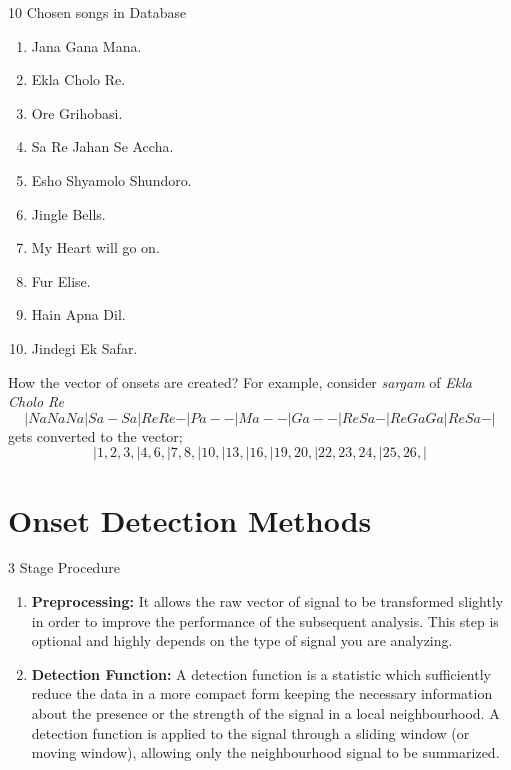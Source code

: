 \documentclass[10pt]{beamer}
\begin{document}
\begin{frame}{10 Chosen songs in Database}
    \begin{multicols}{2}
    \begin{enumerate}
        \item Jana Gana Mana.
        \item Ekla Cholo Re.
        \item Ore Grihobasi.
        \item Sa Re Jahan Se Accha.
        \item Esho Shyamolo Shundoro.
        \item Jingle Bells.
        \item My Heart will go on.
        \item Fur Elise.
        \item Hain Apna Dil.
        \item Jindegi Ek Safar.
    \end{enumerate}
    \end{multicols}
\end{frame}

\begin{frame}{How the vector of onsets are created?}
    For example, consider \textit{sargam} of \textit{Ekla Cholo Re}
    $$\vert Na Na Na \vert Sa - Sa \vert Re Re - \vert Pa - - \vert Ma - - \vert Ga - - \vert Re Sa - \vert Re Ga Ga \vert Re Sa - \vert$$
    gets converted to the vector;
    $$\vert 1, 2, 3, \vert 4, 6, \vert 7, 8, \vert 10,\vert 13, \vert 16,\vert 19, 20, \vert 22, 23, 24, \vert 25, 26,\vert$$
\end{frame}


\section{Onset Detection Methods}

\begin{frame}{3 Stage Procedure}
    \begin{enumerate}
    \item \textbf{Preprocessing:} It allows the raw vector of signal to be transformed slightly in order to improve the performance of the subsequent analysis. This step is optional and highly depends on the type of signal you are analyzing.
    \pause
    \item \textbf{Detection Function:} A detection function is a statistic which sufficiently reduce the data in a more compact form keeping the necessary information about the presence or the strength of the signal in a local neighbourhood. A detection function is applied to the signal through a sliding window (or moving window), allowing only the neighbourhood signal to be summarized.
\end{enumerate}

\end{frame}
\end{document}

